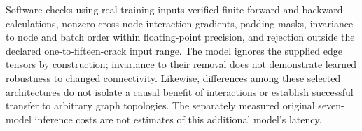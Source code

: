 Software checks using real training inputs verified finite forward and backward calculations, nonzero cross-node interaction gradients, padding masks, invariance to node and batch order within floating-point precision, and rejection outside the declared one-to-fifteen-crack input range. The model ignores the supplied edge tensors by construction; invariance to their removal does not demonstrate learned robustness to changed connectivity. Likewise, differences among these selected architectures do not isolate a causal benefit of interactions or establish successful transfer to arbitrary graph topologies. The separately measured original seven-model inference costs are not estimates of this additional model's latency.
